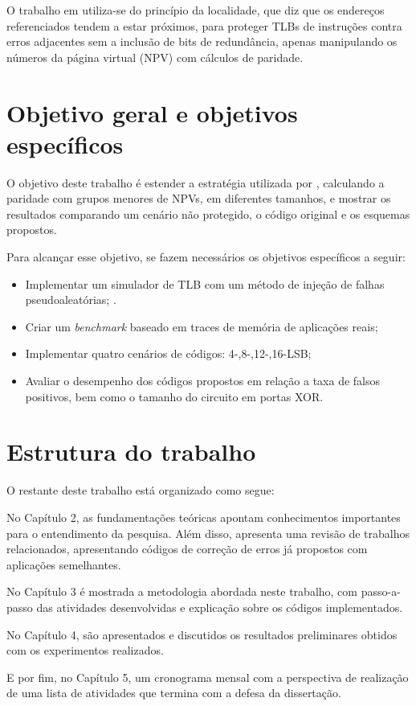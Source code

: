 O trabalho em \cite{sanchez2019reducing}
utiliza-se do princípio da localidade, que diz que os endereços referenciados tendem a estar próximos, para proteger TLBs de instruções contra erros adjacentes sem a inclusão de bits de redundância, apenas manipulando os números da página virtual (NPV) com cálculos de paridade.

\section{Objetivo geral e objetivos específicos}

O objetivo deste trabalho é estender a estratégia utilizada por \cite{sanchez2019reducing}, calculando a paridade com grupos menores de NPVs, em diferentes tamanhos, e mostrar os resultados comparando um cenário não protegido, o código original e os esquemas propostos.

Para alcançar esse objetivo, se fazem necessários os objetivos específicos a seguir:

\begin{itemize}
    \item Implementar um simulador de TLB com um método de injeção de falhas pseudoaleatórias;
.    \item Criar um \textit{benchmark} baseado em traces de memória de aplicações reais;
    \item Implementar quatro cenários de códigos: 4-,8-,12-,16-LSB;
    \item Avaliar o desempenho dos códigos propostos em relação a taxa de falsos positivos, bem como o tamanho do circuito em portas XOR.
\end{itemize}

\section{Estrutura do trabalho}

O restante deste trabalho está organizado como segue:

No Capítulo 2, as fundamentações teóricas apontam conhecimentos importantes para o entendimento da pesquisa. Além disso, apresenta uma revisão de trabalhos relacionados, apresentando códigos de correção de erros já propostos com aplicações semelhantes.

No Capítulo 3 é mostrada a metodologia abordada neste trabalho, com passo-a-passo das atividades desenvolvidas e explicação sobre os códigos implementados.

No Capítulo 4, são apresentados e discutidos os resultados preliminares obtidos com os experimentos realizados.

E por fim, no Capítulo 5, um cronograma mensal com a perspectiva de realização de uma lista de atividades que termina com a defesa da dissertação.